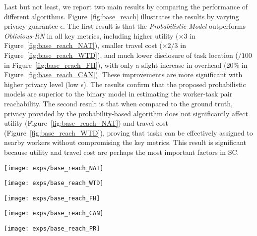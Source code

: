 \documentclass{USC-Thesis}
\numberwithin{equation}{chapter}
\begin{document}
Last but not least, we report two main results by comparing the performance of different algorithms.
Figure~\ref{fig:base_reach} illustrates the results by varying privacy guarantee $\epsilon$. 
The first result is that the \emph{Probabilistic-Model} outperforms \emph{Oblivious-RN} in all key metrics, including higher utility ($\times3$ in Figure~\ref{fig:base_reach_NAT}), smaller travel cost ($\times2/3$ in Figure~\ref{fig:base_reach_WTD}), and much lower disclosure of task location ($/100$ in Figure~\ref{fig:base_reach_FH}), with only a slight increase in overhead (20\% in Figure~\ref{fig:base_reach_CAN}). These improvements are more significant with higher privacy level (low $\epsilon$). The results confirm that the proposed probabilistic models are superior to the binary model in estimating the worker-task pair reachability.
The second result is that when compared to the ground truth, privacy provided by the probability-based algorithm does not significantly affect utility (Figure~\ref{fig:base_reach_NAT}) and travel cost (Figure~\ref{fig:base_reach_WTD}), proving that tasks can be effectively assigned to nearby workers without compromising the key metrics. This result is significant because utility and travel cost are perhaps the most important factors in SC.

\begin{figure*}[!ht]
	\begin{minipage}[b]{0.195\linewidth}
	\centering
		\texttt{[image: exps/base\_reach\_NAT]}
		\label{fig:base_reach_NAT}
	\end{minipage}
	\begin{minipage}[b]{0.195\linewidth}
	\centering
		\texttt{[image: exps/base\_reach\_WTD]}
		\label{fig:base_reach_WTD}
	\end{minipage}	
	\begin{minipage}[b]{0.195\linewidth}
	\centering
		\texttt{[image: exps/base\_reach\_FH]}
		\label{fig:base_reach_FH}
	\end{minipage}
	\begin{minipage}[b]{0.195\linewidth}
	\centering
		\texttt{[image: exps/base\_reach\_CAN]}
		\label{fig:base_reach_CAN}
	\end{minipage}
	\begin{minipage}[b]{0.195\linewidth}
		\centering
		\texttt{[image: exps/base\_reach\_PR]}
		\label{fig:base_reach_PR}
	\end{minipage}
	\caption{Comparison of the algorithms by varying $\epsilon$.}
\label{fig:base_reach}
\end{figure*}
\end{document}
